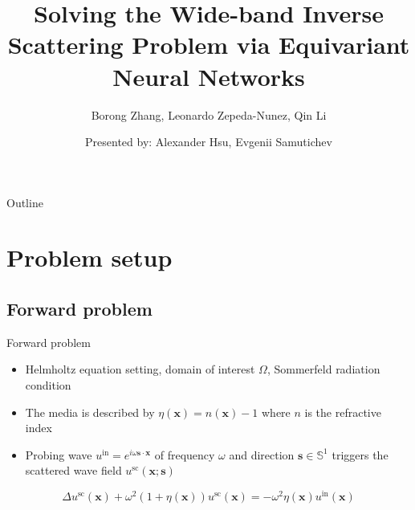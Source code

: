 \documentclass{beamer}
\title{Solving the Wide-band Inverse Scattering Problem via Equivariant Neural Networks}
\subtitle{Borong Zhang, Leonardo Zepeda-Nunez, Qin Li}
\author{Presented by: Alexander Hsu, Evgenii Samutichev}
\begin{document}
\maketitle

\begin{frame}{Outline}
    \tableofcontents
\end{frame}

\section{Problem setup}

\subsection{Forward problem}
\begin{frame}{Forward problem}
    \begin{itemize}
        \item Helmholtz equation setting, domain of interest $\Omega$, Sommerfeld radiation condition
        \item The media is described by $\eta(\mathbf{x}) = n(\mathbf{x}) - 1$ where $n$ is the refractive index
        \item Probing wave $u^{\text{in}} = e^{i \omega \mathbf{s} \cdot \mathbf{x}}$ of frequency $\omega$ and direction $\mathbf{s} \in \mathbb{S}^1$ triggers the scattered wave field $u^{\text{sc}}(\mathbf{x}; \mathbf{s})$
    \end{itemize}
    
    \begin{equation}
        \Delta u^{\text{sc}} (\mathbf{x}) + \omega^2 (1 + \eta(\mathbf{x})) u^{\text{sc}}(\mathbf{x}) = -\omega^2 \eta(\mathbf{x}) u^{\text{in}}(\mathbf{x})
    \end{equation}


\end{frame}
\end{document}
